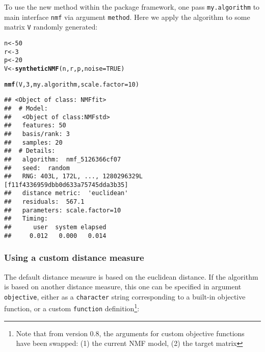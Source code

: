 \documentclass[a4paper]{article}\usepackage{graphicx, color}
\makeatletter
\newcommand{\hlfunctioncall}[1]{\textcolor[rgb]{0.501960784313725,0,0.329411764705882}{\textbf{#1}}}%
\newenvironment{kframe}{%
 \def\at@end@of@kframe{}%
 \ifinner\ifhmode%
  \def\at@end@of@kframe{\end{minipage}}%
  \begin{minipage}{\columnwidth}%
 \fi\fi%
 \def\FrameCommand##1{\hskip\@totalleftmargin \hskip-\fboxsep
 \colorbox{shadecolor}{##1}\hskip-\fboxsep
     \hskip-\linewidth \hskip-\@totalleftmargin \hskip\columnwidth}%
 \MakeFramed {\advance\hsize-\width
   \@totalleftmargin\z@ \linewidth\hsize
   \@setminipage}}%
 {\par\unskip\endMakeFramed%
 \at@end@of@kframe}
\newenvironment{knitrout}{}{} %
\let\code=\texttt
\makeatother
\begin{document}
To use the new method within the package framework, one pass \code{my.algorithm} to main interface \code{nmf} via argument \code{method}. 
Here we apply the algorithm to some matrix \code{V} randomly generated: 

\begin{knitrout}
\color{fgcolor}\begin{kframe}
\begin{alltt}
n <- 50
r <- 3
p <- 20
V <- \hlfunctioncall{syntheticNMF}(n, r, p, noise = TRUE)
\end{alltt}
\end{kframe}
\end{knitrout}


\begin{knitrout}
\color{fgcolor}\begin{kframe}
\begin{alltt}
\hlfunctioncall{nmf}(V, 3, my.algorithm, scale.factor = 10)
\end{alltt}
\begin{verbatim}
## <Object of class: NMFfit>
##  # Model:
##   <Object of class:NMFstd>
##   features: 50 
##   basis/rank: 3 
##   samples: 20 
##  # Details:
##   algorithm:  nmf_5126366cf07 
##   seed:  random 
##   RNG: 403L, 172L, ..., 1280296329L [f11f4336959dbb0d633a75745dda3b35]
##   distance metric:  'euclidean' 
##   residuals:  567.1 
##   parameters: scale.factor=10 
##   Timing:
##      user  system elapsed 
##     0.012   0.000   0.014
\end{verbatim}
\end{kframe}
\end{knitrout}


\subsubsection{Using a custom distance measure}
The default distance measure is based on the euclidean distance. 
If the algorithm is based on another distance measure, this one can be specified in argument \code{objective}, either as a \code{character} string corresponding to a built-in objective function, or a custom \code{function} definition\footnote{Note that from version 0.8, the arguments for custom objective functions have been swapped: (1) the current NMF model, (2) the target matrix}:
\end{document}
